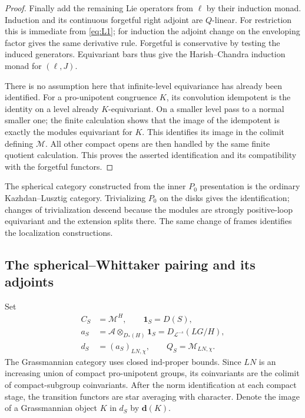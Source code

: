 \begin{proof}
Finally add the remaining Lie operators from $\ell$ by their
induction monad.  Induction and its continuous forgetful right
adjoint are $Q$-linear.  For restriction this is immediate from
\eqref{eq:L1}; for induction the adjoint change on the
enveloping factor gives the same derivative rule.  Forgetful
is conservative by testing the induced generators.  Equivariant
bars thus give the Harish--Chandra induction monad for $(\ell,J)$.

There is no assumption here that infinite-level equivariance has
already been identified.  For a pro-unipotent congruence $K$, its
convolution idempotent is the identity on a level already
$K$-equivariant.  On a smaller level pass to a normal smaller
one; the finite calculation shows that the image of the
idempotent is exactly the modules equivariant for $K$.  This
identifies its image in the colimit defining $\mathcal M$.
All other compact opens are then handled by the same finite
quotient calculation.  This proves the asserted identification
and its compatibility with the forgetful functors.
\end{proof}

The spherical category constructed from the inner $P_0$ presentation
is the ordinary Kazhdan--Lusztig category.  Trivializing $P_0$ on the
disks gives the identification; changes of trivialization descend
because the modules are strongly positive-loop equivariant and the
extension splits there.  The same change of frames identifies the
localization constructions.

\subsection{The spherical--Whittaker pairing and its adjoints}

Set
\[
 \begin{split}
 C_S&=\mathcal M^H,\qquad \mathbf1_S=D(S),\\
 a_S&=\mathcal A\otimes_{D_*(H)}\mathbf1_S
           =D_{\mathcal L^{-s}}(LG/H),\\
 d_S&=(a_S)_{LN,\chi},\qquad
 Q_S=\mathcal M_{LN,\chi}.
 \end{split}
\]
The Grassmannian category uses closed ind-proper bounds.  Since $LN$
is an increasing union of compact pro-unipotent groups, its
coinvariants are the colimit of compact-subgroup coinvariants.
After the norm identification at each compact stage, the transition
functors are star averaging with character.  Denote the image of a
Grassmannian object $K$ in $d_S$ by $\mathbf d(K)$.

